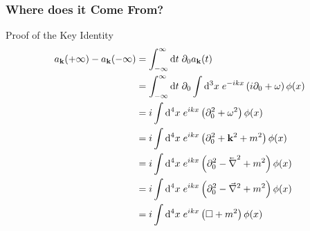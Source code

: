 \documentclass{beamer}
\newcommand{\cev}[1]{\reflectbox{\ensuremath{\vec{\reflectbox{\ensuremath{#1}}}}}}
\begin{document}
\begin{frame}
    \frametitle{Where does it Come From?}
    \begin{block}{Proof of the Key Identity}
        \setlength\abovedisplayskip{0pt}
        \begin{align*}
            a_\mathbf{k}(+\infty) - a_\mathbf{k}(-\infty) &= \int_{-\infty}^\infty \dd t \; \partial_0 a_\mathbf{k}(t) \\
            &= \int_{-\infty}^\infty \dd t \; \partial_0 \int \dd^3 x \; e^{-ikx} \left(i\partial_0 + \omega\right)\phi(x) \\
            &= i\int \dd^4 x\; e^{ikx}\left(\partial_0^2 + \omega^2\right)\phi(x) \\
            &= i\int \dd^4 x\; e^{ikx}\left(\partial_0^2 + \mathbf{k}^2 + m^2\right)\phi(x) \\
            &= i\int \dd^4 x\; e^{ikx}\left(\partial_0^2 - \cev{\nabla}^2 + m^2\right)\phi(x) \\
            &= i\int \dd^4 x\; e^{ikx}\left(\partial_0^2 - \vec{\nabla}^2 + m^2\right)\phi(x) \\
            &= i\int \dd^4 x\; e^{ikx}\left(\Box + m^2\right)\phi(x)
        \end{align*}
    \end{block}
\end{frame}
\end{document}
